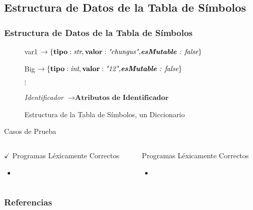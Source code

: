 \documentclass[14pt, aspectratio=169]{beamer}
\begin{document}
\subsection{Estructura de Datos de la Tabla de Símbolos}

\begin{frame}
    \frametitle{Estructura de Datos de la Tabla de Símbolos}
    \begin{figure}[H]
        \begin{mdframed}
            \textnormal{var1} $\rightarrow \left\{\textbf{tipo}: \textit{str},\textbf{valor}:\textit{"chungus",\textbf{esMutable} : false}\right\}$

            \textnormal{Big} $\rightarrow \left\{\textbf{tipo}: \textit{int},\textbf{valor}:\textit{"12",\textbf{esMutable} : false}\right\}$
            \begin{center}
                $\vdots$
            \end{center}

            \textit{Identificador}  $\rightarrow \textbf{Atributos de Identificador}$
        \end{mdframed}
        \label{fig: symbolTableStruct}
        \caption{Estructura de la Tabla de Símbolos, un Diccionario}
    \end{figure}
\end{frame}

\begin{frame}{Casos de Prueba}
    \begin{columns}
        \begin{column}{0.5\textwidth}
            {\color{green} $\checkmark$} Programas Léxicamente Correctos
            \begin{itemize}
                \item 
            \end{itemize}
        \end{column}

        \begin{column}{0.5\textwidth}
            {\color{red} } Programas Léxicamente Correctos
            \begin{itemize}
                \item 
            \end{itemize}
        \end{column}
    \end{columns}
    

\end{frame}

\begin{frame}[allowframebreaks]
    \frametitle{Referencias}
    
    
\end{frame}
\end{document}
